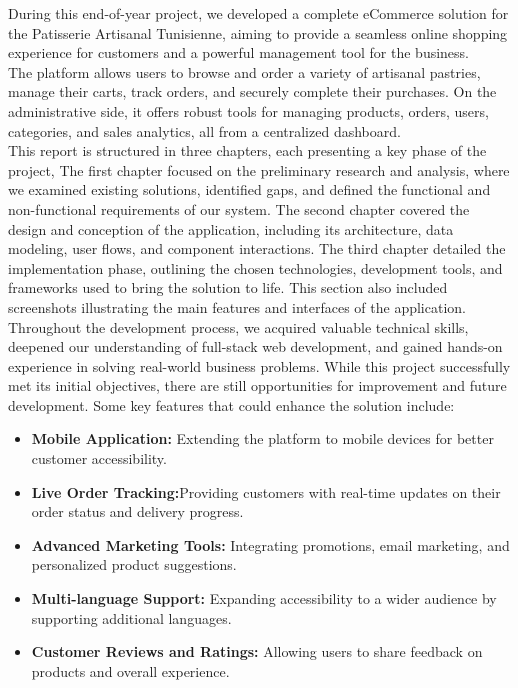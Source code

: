 \vspace{1cm} 

During this end-of-year project, we developed a complete eCommerce solution for the Patisserie Artisanal Tunisienne, aiming to provide a seamless online shopping experience for customers and a powerful management tool for the business.\\

The platform allows users to browse and order a variety of artisanal pastries, manage their carts, track orders, and securely complete their purchases. On the administrative side, it offers robust tools for managing products, orders, users, categories, and sales analytics, all from a centralized dashboard.\\

This report is structured in three chapters, each presenting a key phase of the project, The first chapter focused on the preliminary research and analysis, where we examined existing solutions, identified gaps, and defined the functional and non-functional requirements of our system. The second chapter covered the design and conception of the application, including its architecture, data modeling, user flows, and component interactions. The third chapter detailed the implementation phase, outlining the chosen technologies, development tools, and frameworks used to bring the solution to life. This section also included screenshots illustrating the main features and interfaces of the application.\\

Throughout the development process, we acquired valuable technical skills, deepened our understanding of full-stack web development, and gained hands-on experience in solving real-world business problems.
While this project successfully met its initial objectives, there are still opportunities for improvement and future development. Some key features that could enhance the solution include:

\begin{itemize}[label=\textbullet]
    \item \textbf{Mobile Application:} Extending the platform to mobile devices for better customer accessibility.
    \item \textbf{Live Order Tracking:}Providing customers with real-time updates on their order status and delivery progress.
    \item \textbf{Advanced Marketing Tools:} Integrating promotions, email marketing, and personalized product suggestions.
    \item \textbf{Multi-language Support:} Expanding accessibility to a wider audience by supporting additional languages.
    \item \textbf{Customer Reviews and Ratings:} Allowing users to share feedback on products and overall experience.
\end{itemize}

